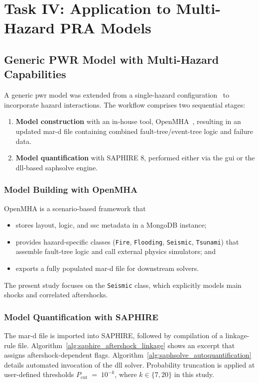 \chapter{Task IV: Application to Multi-Hazard PRA Models}
\label{cha:task_iv}

\section{Generic PWR Model with Multi-Hazard Capabilities}
\label{sec:PWR_model}
A generic \acrshort{pwr} model was extended from a single-hazard configuration~\cite{Smith2021Generic} to incorporate hazard interactions.  The workflow comprises two sequential stages:

\begin{enumerate}
  \item \textbf{Model construction} with an in-house tool, OpenMHA~\cite{Batikh2024OpenMHA}, resulting in an updated \acrshort{mar-d} file containing combined fault-tree/event-tree logic and failure data.
  \item \textbf{Model quantification} with SAPHIRE 8, performed either via the \acrshort{gui} or the \acrshort{dll}-based \acrshort{saphsolve} engine.
\end{enumerate}

\subsection{Model Building with OpenMHA}
OpenMHA is a scenario-based framework that
\begin{itemize}
  \item stores layout, logic, and \acrshort{ssc} metadata in a MongoDB instance;
  \item provides hazard-specific classes (\texttt{Fire}, \texttt{Flooding}, \texttt{Seismic}, \texttt{Tsunami}) that assemble fault-tree logic and call external physics simulators; and
  \item exports a fully populated \acrshort{mar-d} file for downstream solvers.
\end{itemize}
The present study focuses on the \texttt{Seismic} class, which explicitly models main shocks and correlated aftershocks.

\subsection{Model Quantification with SAPHIRE}
\label{sec:saphire_quant}
The \acrshort{mar-d} file is imported into SAPHIRE, followed by compilation of a linkage-rule file. Algorithm~\ref{alg:saphire_aftershock_linkage} shows an excerpt that assigns aftershock-dependent flags. Algorithm~\ref{alg:saphsolve_autoquantification} details automated invocation of the \acrshort{dll} solver. Probability truncation is applied at user-defined thresholds $P_{\text{cut}} \;=\;10^{-k}$, where $k\in\{7,20\}$ in this study.

